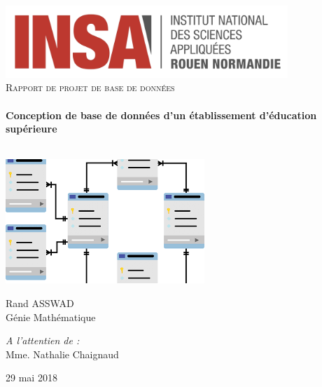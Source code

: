 \begin{titlepage}
  \begin{sffamily}
  \begin{center}
	\includegraphics[width=0.8\textwidth]{img/INSA_logo.png}\\[2cm]

    \textsc{\huge Rapport de projet de base de données}\\[1cm]

    \HRule \\[0.4cm]
    {\huge \bfseries Conception de base de données d'un établissement
	  d'éducation supérieure \\[0.4cm]}

    \HRule \\[2cm]
    \includegraphics[width=.7\textwidth]{img/bdd-cover.png}~\\[1.5cm]

    \begin{minipage}{0.4\textwidth}
      \begin{flushleft} \large
        Rand ASSWAD\\
		Génie Mathématique\\
      \end{flushleft}
    \end{minipage}
    \begin{minipage}{0.4\textwidth}
      \begin{flushright} \large
        \emph{A l'attentien de :}\\
		Mme. Nathalie Chaignaud
      \end{flushright}
	\end{minipage}

	\vfill
    {\large 29 mai 2018}
  \end{center}
  \end{sffamily}
\end{titlepage}

